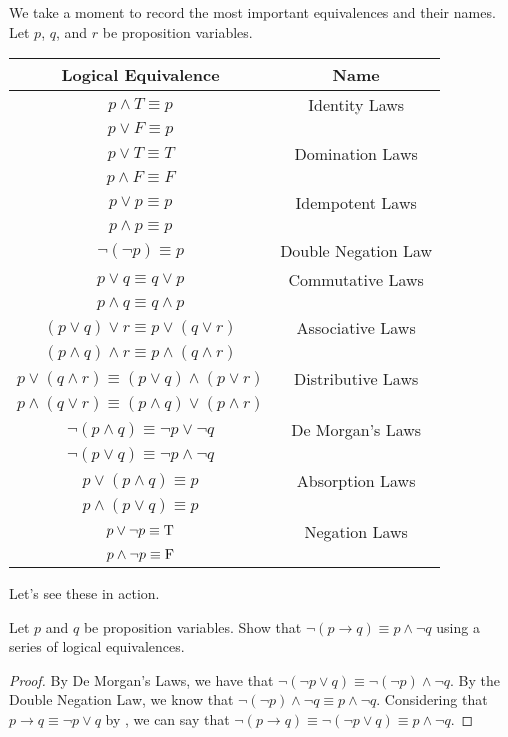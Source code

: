 \documentclass[../main.tex]{subfiles}
\begin{document}
We take a moment to record the most important equivalences and their names. Let $p$, $q$, and $r$ be proposition variables.
\begin{center}
    \begin{tabular}{ c|c }
    Logical Equivalence & Name \\
    \hline
    $p \land T \equiv p$ & Identity Laws \\
    $p \lor F \equiv p$ & \\
    \hline
    $p \lor T \equiv T $ & Domination Laws \\
    $p \land F \equiv F$ & \\
    \hline
    $p \lor p \equiv p $ & Idempotent Laws \\
    $p \land p \equiv p$ & \\
    \hline
    $\neg (\neg p) \equiv p$ & Double Negation Law \\
    \hline
    $p \lor q \equiv q \lor p $ & Commutative Laws \\
    $p \land q \equiv q \land p $ & \\
    \hline
    $(p \lor q) \lor r \equiv p \lor (q \lor r)$ & Associative Laws \\
    $(p \land q) \land r \equiv p \land (q \land r)$ & \\
    \hline
    $ p \lor (q \land r) \equiv (p \lor q) \land (p \lor r)$ & Distributive Laws \\
    $ p \land (q \lor r) \equiv (p \land q) \lor (p \land r)$ & \\
    \hline
    $ \neg (p \land q) \equiv \neg p \lor \neg q$ & De Morgan's Laws \\
    $ \neg (p \lor q) \equiv \neg p \land \neg q$ & \\
    \hline
    $ p \lor (p \land q) \equiv p$ & Absorption Laws \\
    $ p \land (p \lor q) \equiv p$ & \\
    \hline
    $ p \lor \neg p \equiv\text T$ & Negation Laws \\
    $ p \land \neg p \equiv\text F$ &
    \end{tabular}
\end{center}
Let's see these in action.
\begin{example} \label{exe:better-arrow}
    Let $p$ and $q$ be proposition variables. Show that $\neg(p \rightarrow q)  \equiv p \land \neg q$ using a series of logical equivalences. 
\end{example}
\begin{proof}
    By De Morgan's Laws, we have that $\neg (\neg p \lor q) \equiv \neg (\neg p) \land \neg q$. By the Double Negation Law, we know that $\neg (\neg p) \land \neg q \equiv  p \land \neg q.$ Considering that $p \rightarrow q \equiv \neg p \lor q$ by , we can say that  $\neg(p \rightarrow q) \equiv \neg(\neg p \lor q) \equiv p \land \neg q.$
\end{proof}
\end{document}
